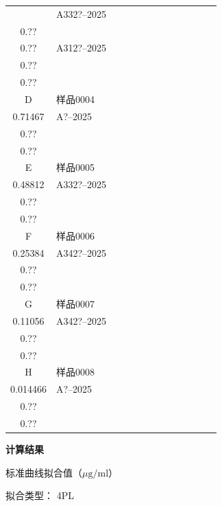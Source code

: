 \documentclass[UTF8,10pt,a4paper,fontset=fandol]{ctexart}
\newcommand{\fieldvalue}[1]{#1}
\begin{document}
\begin{center}
\begin{tabular}{c|p{1.35cm}|p{1.35cm}|p{1.35cm}|p{1.35cm}|p{1.35cm}|p{1.35cm}|p{1.35cm}|p{1.35cm}|p{1.35cm}|p{1.35cm}|p{1.35cm}|p{1.35cm}}
&
\fieldvalue{A332?--2025\\0.??\\0.??}
&
\fieldvalue{A312?--2025\\0.??\\0.??}
& & & & & & & &\\
\hline
D &
\fieldvalue{样品0004\\0.71467}
&
\fieldvalue{A?--2025\\0.??\\0.??}
& & & & & & & & & &\\
\hline
E &
\fieldvalue{样品0005\\0.48812}
&
\fieldvalue{A332?--2025\\0.??\\0.??}
& & & & & & & & & &\\
\hline
F &
\fieldvalue{样品0006\\0.25384}
&
\fieldvalue{A342?--2025\\0.??\\0.??}
& & & & & & & & & &\\
\hline
G &
\fieldvalue{样品0007\\0.11056}
&
\fieldvalue{A342?--2025\\0.??\\0.??}
& & & & & & & & & &\\
\hline
H &
\fieldvalue{样品0008\\0.014466}
&
\fieldvalue{A?--2025\\0.??\\0.??}
& & & & & & & & & &\\
\hline
\end{tabular}
\end{center}

\textbf{计算结果}

标准曲线拟合值（$\mu\mathrm{g}/\mathrm{ml}$）

拟合类型：
\fieldvalue{4PL}
\end{document}
